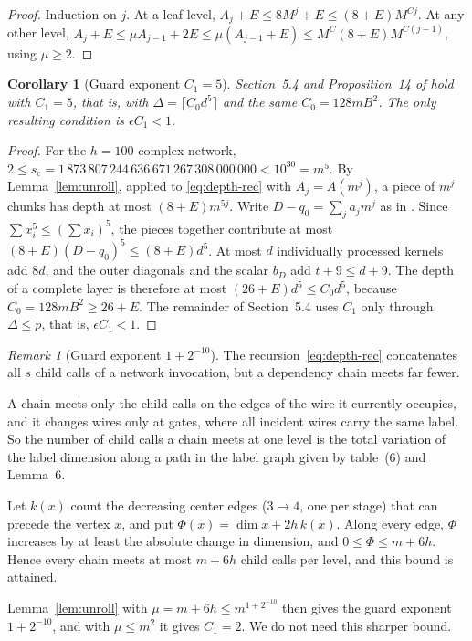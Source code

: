 \documentclass[11pt]{article}
\numberwithin{equation}{section}
\numberwithin{table}{section}
\newtheorem{corollary}[theorem]{Corollary}
\theoremstyle{remark}
\newtheorem{remark}[theorem]{Remark}
\newcommand{\OAI}{\cite{OAI}}
\newcommand{\scc}{s_{\mathrm c}}
\begin{document}
\begin{proof}
Induction on $j$. At a leaf level, $A_j+E\le 8M^j+E\le(8+E)M^{Cj}$. At
any other level, $A_j+E\le\mu A_{j-1}+2E\le\mu(A_{j-1}+E)\le
M^C(8+E)M^{C(j-1)}$, using $\mu\ge2$.
\end{proof}

\begin{corollary}[Guard exponent $C_1=5$]\label{cor:C1}
Section~5.4 and Proposition~14 of \OAI{} hold with $C_1=5$, that is,
with $\Delta=\lceil C_0d^5\rceil$ and the same $C_0=128mB^2$. The only
resulting condition is $\epsilon C_1<1$.
\end{corollary}

\begin{proof}
For the $h=100$ complex network,
$2\le\scc=1\,873\,807\,244\,636\,671\,267\,308\,000\,000<10^{30}=m^5$.
By Lemma~\ref{lem:unroll}, applied to \eqref{eq:depth-rec} with
$A_j=A(m^j)$, a piece of $m^j$ chunks has depth at most
$(8+E)m^{5j}$. Write $D-q_0=\sum_ja_jm^j$ as in \OAI. Since $\sum
x_i^5\le(\sum x_i)^5$, the pieces together contribute at most
$(8+E)(D-q_0)^5\le(8+E)d^5$. At most $d$ individually processed kernels
add $8d$, and the outer diagonals and the scalar $b_D$ add $t+9\le
d+9$. The depth of a complete layer is therefore at most
$(26+E)d^5\le C_0d^5$, because $C_0=128mB^2\ge26+E$. The remainder of
Section~5.4 uses $C_1$ only through $\Delta\le p$, that is,
$\epsilon C_1<1$.
\end{proof}

\begin{remark}[Guard exponent $1+2^{-10}$]\label{rem:tv}
The recursion~\eqref{eq:depth-rec} concatenates all $s$ child calls of
a network invocation, but a dependency chain meets far fewer.

A chain meets only the child calls on the edges of the wire it
currently occupies, and it changes wires only at gates, where all
incident wires carry the same label. So the number of child calls a
chain meets at one level is the total variation of the label dimension
along a path in the label graph given by table~(6) and Lemma~6.

Let $k(x)$ count the decreasing center edges ($3\to4$, one per stage)
that can precede the vertex $x$, and put
$\Phi(x)=\dim x+2h\,k(x)$. Along every edge, $\Phi$ increases by at
least the absolute change in dimension, and $0\le\Phi\le m+6h$. Hence every chain
meets at most $m+6h$ child calls per level, and this bound is attained.

Lemma~\ref{lem:unroll} with $\mu=m+6h\le m^{1+2^{-10}}$ then gives the
guard exponent $1+2^{-10}$, and with $\mu\le m^2$ it gives $C_1=2$. We
do not need this sharper bound.
\end{remark}
\end{document}
